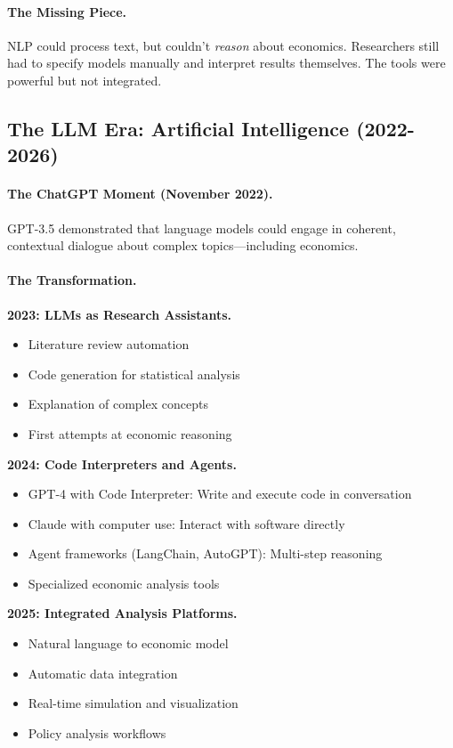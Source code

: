 \documentclass[12pt,a4paper]{article}
\begin{document}
\paragraph{The Missing Piece.}
NLP could process text, but couldn't \emph{reason} about economics.
Researchers still had to specify models manually and interpret results themselves.
The tools were powerful but not integrated.

\subsection{The LLM Era: Artificial Intelligence (2022-2026)}

\paragraph{The ChatGPT Moment (November 2022).}
GPT-3.5 demonstrated that language models could engage in coherent,
contextual dialogue about complex topics---including economics.

\paragraph{The Transformation.}

\textbf{2023: LLMs as Research Assistants.}
\begin{itemize}
  \item Literature review automation
  \item Code generation for statistical analysis
  \item Explanation of complex concepts
  \item First attempts at economic reasoning
\end{itemize}

\textbf{2024: Code Interpreters and Agents.}
\begin{itemize}
  \item GPT-4 with Code Interpreter: Write and execute code in conversation
  \item Claude with computer use: Interact with software directly
  \item Agent frameworks (LangChain, AutoGPT): Multi-step reasoning
  \item Specialized economic analysis tools
\end{itemize}

\textbf{2025: Integrated Analysis Platforms.}
\begin{itemize}
  \item Natural language to economic model
  \item Automatic data integration
  \item Real-time simulation and visualization
  \item Policy analysis workflows
\end{itemize}
\end{document}
